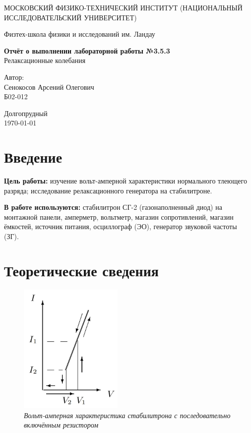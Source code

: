 \documentclass[a4paper,12pt]{article} %
\date{\today}
\begin{document}
\begin{titlepage}
	\begin{center}
		{\large МОСКОВСКИЙ ФИЗИКО-ТЕХНИЧЕСКИЙ ИНСТИТУТ (НАЦИОНАЛЬНЫЙ ИССЛЕДОВАТЕЛЬСКИЙ УНИВЕРСИТЕТ)}
	\end{center}
	\begin{center}
		{\large Физтех-школа физики и исследований им. Ландау}
	\end{center}
	
	
	\vspace{4.5cm}
	{\huge
		\begin{center}
			{\bf Отчёт о выполнении лабораторной работы №3.5.3}\\
			Релаксационные колебания
		\end{center}
	}
	\vspace{2cm}
	\begin{flushright}
		{\LARGE Автор:\\ Сенокосов Арсений Олегович \\
			\vspace{0.2cm}
			Б02-012}
	\end{flushright}
	\vspace{8cm}
	\begin{center}
		Долгопрудный\\
		\today
	\end{center}
\end{titlepage}
\section{Введение}

\textbf{Цель работы:} изучение вольт-амперной характеристики нормального тлеющего разряда; исследование релаксационного генератора на стабилитроне.


\textbf{В работе используются:} стабилитрон СГ-2 (газонаполненный диод) на монтажной панели, амперметр, вольтметр, магазин сопротивлений, магазин ёмкостей, источник питания, осциллограф (ЭО), генератор звуковой частоты (ЗГ).

\section{Теоретические сведения}

\begin{figure}
	\includegraphics[width=5cm]{ris1.jpg}
	\caption{\textit{Вольт-амперная характеристика стабилитрона с последовательно включённым резистором}}
	\label{ris1}
\end{figure}
\end{document}
